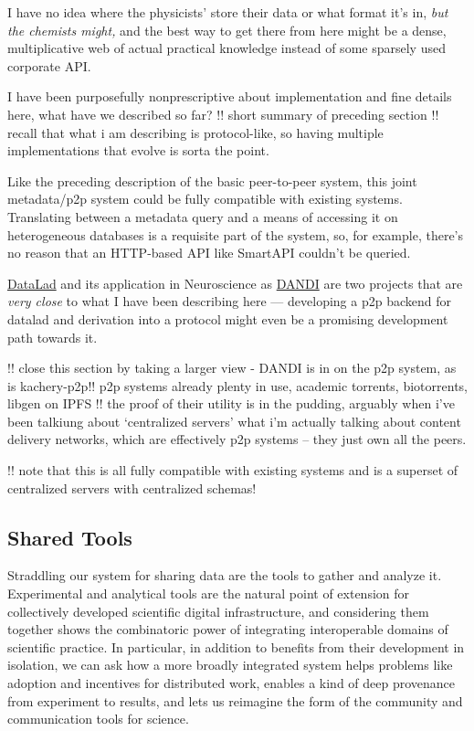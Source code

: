 \documentclass[10pt]{tufte-book}
\begin{document}
I have no idea where the physicists' store their data or what format
it's in, \emph{but the chemists might,} and the best way to get there
from here might be a dense, multiplicative web of actual practical
knowledge instead of some sparsely used corporate API.

I have been purposefully nonprescriptive about implementation and fine
details here, what have we described so far? !! short summary of
preceding section !! recall that what i am describing is protocol-like,
so having multiple implementations that evolve is sorta the point.

Like the preceding description of the basic peer-to-peer system, this
joint metadata/p2p system could be fully compatible with existing
systems. Translating between a metadata query and a means of accessing
it on heterogeneous databases is a requisite part of the system, so, for
example, there's no reason that an HTTP-based API like SmartAPI couldn't
be queried.

\href{https://www.datalad.org/}{DataLad} \citep{halchenkoDataLadDistributedSystem2021, hankeDefenseDecentralizedResearch2021}  and its application in
Neuroscience as \href{https://dandiarchive.org}{DANDI} are two projects
that are \emph{very close} to what I have been describing here ---
developing a p2p backend for datalad and derivation into a protocol
might even be a promising development path towards it.

!! close this section by taking a larger view - \citep{langilleBioTorrentsFileSharing2010}  DANDI is in on the p2p system,
as is kachery-p2p!! p2p systems already plenty in use, academic
torrents, biotorrents, libgen on IPFS !! the proof of their utility is
in the pudding, arguably when i've been talkiung about `centralized
servers' what i'm actually talking about content delivery networks,
which are effectively p2p systems -- they just own all the peers.

!! note that this is all fully compatible with existing systems and is a
superset of centralized servers with centralized schemas! 




\subsection{Shared Tools}



 Straddling our system for sharing data are the tools to
gather and analyze it. Experimental and analytical tools are the natural
point of extension for collectively developed scientific digital
infrastructure, and considering them together shows the combinatoric
power of integrating interoperable domains of scientific practice. In
particular, in addition to benefits from their development in isolation,
we can ask how a more broadly integrated system helps problems like
adoption and incentives for distributed work, enables a kind of deep
provenance from experiment to results, and lets us reimagine the form of
the community and communication tools for science.
\end{document}
